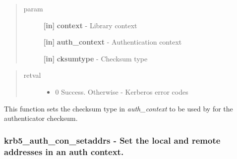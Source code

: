 \documentclass[letterpaper,10pt,english]{sphinxmanual}
\begin{document}
\begin{fulllineitems}
\label{appdev/refs/api/krb5_auth_con_set_req_cksumtype:c.krb5_auth_con_set_req_cksumtype}
\end{fulllineitems}

\begin{quote}\begin{description}
\item[{param}] \leavevmode
\textbf{{[}in{]}} \textbf{context} - Library context

\textbf{{[}in{]}} \textbf{auth\_context} - Authentication context

\textbf{{[}in{]}} \textbf{cksumtype} - Checksum type

\end{description}\end{quote}
\begin{quote}\begin{description}
\item[{retval}] \leavevmode\begin{itemize}
\item {} 
0   Success. Otherwise - Kerberos error codes

\end{itemize}

\end{description}\end{quote}

This function sets the checksum type in \emph{auth\_context} to be used by {\hyperref[appdev/refs/api/krb5_mk_req:c.krb5_mk_req]{}} for the authenticator checksum.


\subsubsection{krb5\_auth\_con\_setaddrs -  Set the local and remote addresses in an auth context.}
\label{appdev/refs/api/krb5_auth_con_setaddrs::doc}\label{appdev/refs/api/krb5_auth_con_setaddrs:krb5-auth-con-setaddrs-set-the-local-and-remote-addresses-in-an-auth-context}
\end{document}

